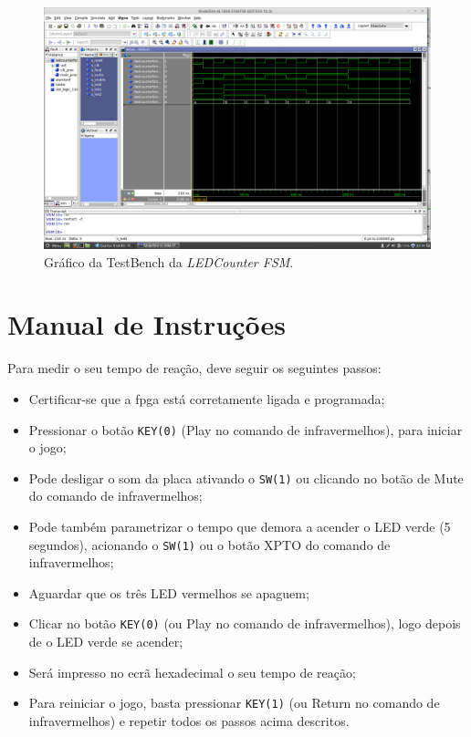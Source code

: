 \documentclass[a4paper,11pt,onecolumn]{report}
\begin{document}
\begin{figure}[h]
\centerline{\includegraphics[scale=0.33]{Images/LEDCounterFSMTB}}
\caption{Gráfico da TestBench da \textit{LEDCounter FSM}.}
\label{figledcounterfsmtb}
\end{figure}

\section{Manual de Instruções}
Para medir o seu tempo de reação, deve seguir os seguintes passos:
\begin{itemize}
\item Certificar-se que a \ac{fpga} está corretamente ligada e programada;
\item Pressionar o botão \texttt{KEY(0)} (Play no comando de infravermelhos), para iniciar o jogo;
\item Pode desligar o som da placa ativando o \texttt{SW(1)} ou clicando no botão de Mute do comando de infravermelhos;
\item Pode também parametrizar o tempo que demora a acender o LED verde (5 segundos), acionando o \texttt{SW(1)} ou o botão XPTO do comando de infravermelhos;
\item Aguardar que os três LED vermelhos se apaguem;
\item Clicar no botão \texttt{KEY(0)} (ou Play no comando de infravermelhos), logo depois de o LED verde se acender;
\item Será impresso no ecrã hexadecimal o seu tempo de reação;
\item Para reiniciar o jogo, basta pressionar \texttt{KEY(1)} (ou Return no comando de infravermelhos) e repetir todos os passos acima descritos.
\end{itemize}
\end{document}
